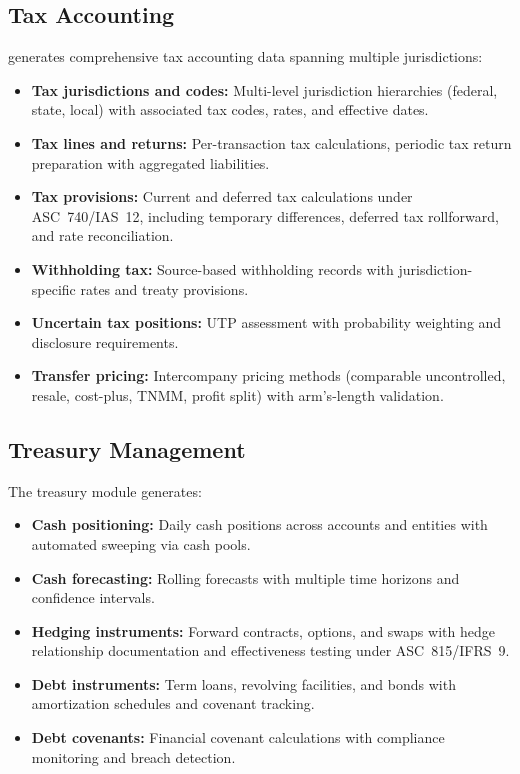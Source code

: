 \subsection{Tax Accounting}
\label{sec:gen_tax}

\system{} generates comprehensive tax accounting data spanning multiple
jurisdictions:

\begin{itemize}
  \item \textbf{Tax jurisdictions and codes:} Multi-level jurisdiction
    hierarchies (federal, state, local) with associated tax codes,
    rates, and effective dates.
  \item \textbf{Tax lines and returns:} Per-transaction tax calculations,
    periodic tax return preparation with aggregated liabilities.
  \item \textbf{Tax provisions:} Current and deferred tax calculations
    under ASC~740/IAS~12, including temporary differences, deferred tax
    rollforward, and rate reconciliation.
  \item \textbf{Withholding tax:} Source-based withholding records with
    jurisdiction-specific rates and treaty provisions.
  \item \textbf{Uncertain tax positions:} UTP assessment with probability
    weighting and disclosure requirements.
  \item \textbf{Transfer pricing:} Intercompany pricing methods
    (comparable uncontrolled, resale, cost-plus, TNMM, profit split)
    with arm's-length validation.
\end{itemize}

\subsection{Treasury Management}
\label{sec:gen_treasury}

The treasury module generates:

\begin{itemize}
  \item \textbf{Cash positioning:} Daily cash positions across accounts
    and entities with automated sweeping via cash pools.
  \item \textbf{Cash forecasting:} Rolling forecasts with multiple
    time horizons and confidence intervals.
  \item \textbf{Hedging instruments:} Forward contracts, options, and
    swaps with hedge relationship documentation and effectiveness
    testing under ASC~815/IFRS~9.
  \item \textbf{Debt instruments:} Term loans, revolving facilities, and
    bonds with amortization schedules and covenant tracking.
  \item \textbf{Debt covenants:} Financial covenant calculations with
    compliance monitoring and breach detection.
\end{itemize}

